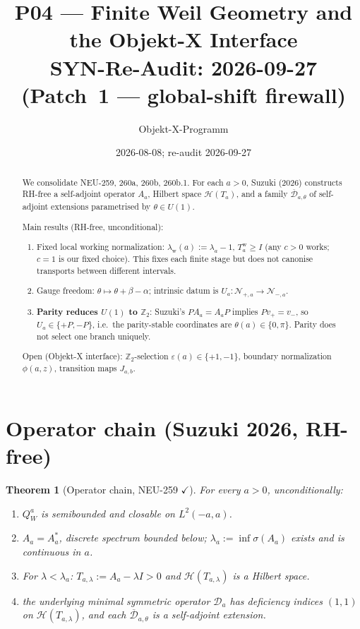 \documentclass[11pt,a4paper]{amsart}
\title{P04 --- Finite Weil Geometry and the Objekt-X Interface\\
\normalsize SYN-Re-Audit: 2026-09-27 (Patch~1 --- global-shift firewall)}
\author{Objekt-X-Programm}
\date{2026-08-08; re-audit 2026-09-27}
\newtheorem{theorem}{Theorem}[section]
\begin{document}
\maketitle

\begin{abstract}
We consolidate NEU-259, 260a, 260b, 260b.1.
For each $a>0$, Suzuki (2026) constructs RH-free a self-adjoint
operator $A_a$, Hilbert space $\mathcal{H}(T_a)$, and a family
$\overline{\mathscr{D}}_{a,\theta}$ of self-adjoint extensions
parametrised by $\theta\in U(1)$.

Main results (RH-free, unconditional):
\begin{enumerate}
\item Fixed local working normalization:
  $\lambda_{\mathrm{w}}(a):=\lambda_a-1$, $T_a^{\mathrm{w}}\ge I$
  (any $c>0$ works; $c=1$ is our fixed choice). This fixes each finite stage
  but does not canonise transports between different intervals.
\item Gauge freedom: $\theta\mapsto\theta+\beta-\alpha$;
  intrinsic datum is $U_a:\mathcal{N}_{+,a}\to\mathcal{N}_{-,a}$.
\item \textbf{Parity reduces $U(1)$ to $\mathbb{Z}_2$}:
  Suzuki's $PA_a=A_aP$ implies $Pv_+=v_-$, so
  $U_a\in\{+P,-P\}$, i.e.\ the parity-stable coordinates are
  $\theta(a)\in\{0,\pi\}$. Parity does not select one branch uniquely.
\end{enumerate}

Open (Objekt-X interface):
$\mathbb{Z}_2$-selection $\varepsilon(a)\in\{+1,-1\}$,
boundary normalization $\phi(a,z)$, transition maps $J_{a,b}$.
\end{abstract}

\section{Operator chain (Suzuki 2026, RH-free)}

\begin{theorem}[Operator chain, NEU-259 $\checkmark$]
For every $a>0$, unconditionally:
\begin{enumerate}
\item $Q_W^a$ is semibounded and closable on $L^2(-a,a)$.
\item $A_a=A_a^*$, discrete spectrum bounded below;
  $\lambda_a:=\inf\sigma(A_a)$ exists and is continuous in $a$.
\item For $\lambda<\lambda_a$: $T_{a,\lambda}:=A_a-\lambda I>0$
  and $\mathcal{H}(T_{a,\lambda})$ is a Hilbert space.
\item the underlying minimal symmetric operator $\mathscr{D}_a$ has deficiency
  indices $(1,1)$ on $\mathcal{H}(T_{a,\lambda})$, and each
  $\overline{\mathscr{D}}_{a,\theta}$ is a self-adjoint extension.
\end{enumerate}
\end{theorem}
\end{document}
